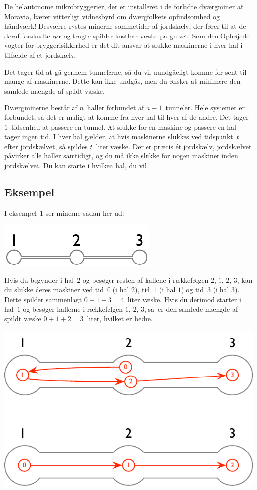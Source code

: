 
\noindent
De helautonome mikrobryggerier, der er installeret i de forladte dværgminer af Moravia, bærer vitterligt vidnesbyrd om dværgfolkets opfindsomhed og håndværk!
Desværre rystes minerne sommetider af jordskælv, der fører til at de deraf forskudte rør og tragte spilder kostbar væske på gulvet.
Som den Ophøjede vogter for bryggerisikkerhed er det dit ansvar at slukke maskinerne i hver hal i tilfælde af et jordskælv.

Det tager tid at gå gennem tunnelerne,
så du vil uundgåeligt komme for sent til mange af maskinerne.
Dette kan ikke undgås, men du ønsker at minimere den samlede mængde af spildt væske.

\medskip
Dværgminerne består af $n$~haller forbundet af $n-1$~tunneler.
Hele systemet er forbundet, så det er muligt at komme fra hver hal til hver af de andre.
Det tager $1$~tidsenhed at passere en tunnel.
At slukke for en maskine og passere en hal tager ingen tid.
I hver hal gælder, at hvis maskinerne slukkes ved tidspunkt~$t$ efter jordskælvet, så spildes $t$~liter væske.
Der er præcis ét jordskælv, jordskælvet påvirker alle haller samtidigt, og du må ikke slukke for nogen maskiner inden jordskælvet.
Du kan starte i hvilken hal, du vil.



\subsection*{Eksempel}

I eksempel~$1$ ser minerne sådan her ud:

\includegraphics[width=.2\textwidth]{img/sample-1.pdf}

Hvis du begynder i hal~$2$ og besøger resten af hallene i rækkefølgen $2$, $1$, $2$, $3$, kan du slukke deres maskiner ved tid~$0$ (i hal $2$), tid~$1$ (i hal $1$) og tid~$3$ (i hal $3$).
Dette spilder sammenlagt $0+1+3=4$~liter væske.
Hvis du derimod starter i hal~$1$ og besøger hallerne i rækkefølgen $1$, $2$, $3$, så er den samlede mængde af spildt væske $0+1+2=3$~liter, hvilket er bedre.

\includegraphics[width=.4\textwidth]{img/sample-1-ans.pdf}

